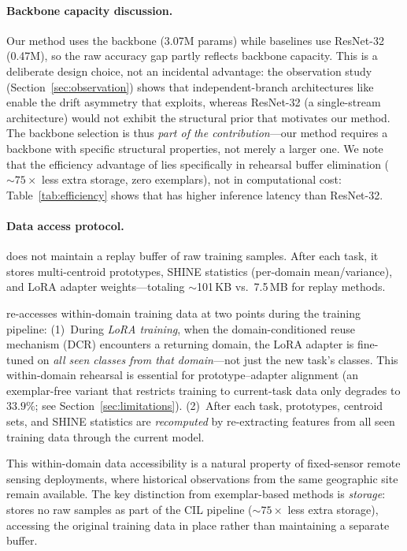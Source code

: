 \paragraph{Backbone capacity discussion.}
Our method uses the \backbonename{} backbone (3.07M params) while baselines use ResNet-32 (0.47M), so the raw accuracy gap partly reflects backbone capacity.
This is a deliberate design choice, not an incidental advantage: the observation study (Section~\ref{sec:observation}) shows that independent-branch architectures like \backbonename{} enable the drift asymmetry that \methodname{} exploits, whereas ResNet-32 (a single-stream architecture) would not exhibit the structural prior that motivates our method.
The backbone selection is thus \emph{part of the contribution}---our method requires a backbone with specific structural properties, not merely a larger one.
We note that the efficiency advantage of \methodname{} lies specifically in rehearsal buffer elimination (${\sim}75\times$ less extra storage, zero exemplars), not in computational cost: Table~\ref{tab:efficiency} shows that \backbonename{} has higher inference latency than ResNet-32.

\paragraph{Data access protocol.}
\methodname{} does not maintain a replay buffer of raw training samples.
After each task, it stores multi-centroid prototypes, SHINE statistics (per-domain mean/variance), and LoRA adapter weights---totaling $\sim$101\,KB vs.\ 7.5\,MB for replay methods.

\methodname{} re-accesses within-domain training data at two points during the training pipeline:
(1)~During \emph{LoRA training}, when the domain-conditioned reuse mechanism (DCR) encounters a returning domain, the LoRA adapter is fine-tuned on \emph{all seen classes from that domain}---not just the new task's classes. This within-domain rehearsal is essential for prototype--adapter alignment (an exemplar-free variant that restricts training to current-task data only degrades to $33.9\%$; see Section~\ref{sec:limitations}).
(2)~After each task, prototypes, centroid sets, and SHINE statistics are \emph{recomputed} by re-extracting features from all seen training data through the current model.

This within-domain data accessibility is a natural property of fixed-sensor remote sensing deployments, where historical observations from the same geographic site remain available.
The key distinction from exemplar-based methods is \emph{storage}: \methodname{} stores no raw samples as part of the CIL pipeline (${\sim}75\times$ less extra storage), accessing the original training data in place rather than maintaining a separate buffer.

